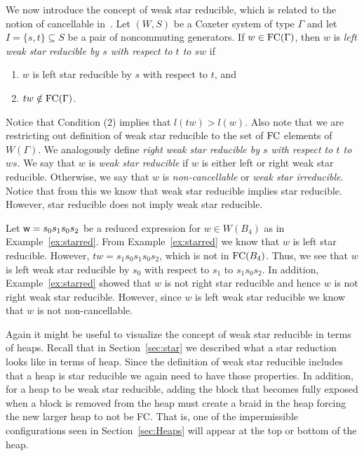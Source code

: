 We now introduce the concept of weak star reducible, which is related to the notion of cancellable in~\cite{Fan1997}. Let $(W,S)$ be a Coxeter system of type $\Gamma$ and let $I=\{s,t\} \subseteq S$ be a pair of noncommuting generators. If $w  \in \mathrm{FC}(\Gamma)$, then $w$ is \emph{left weak star reducible by $s$ with respect to $t$ to $sw$} if
\begin{enumerate}[leftmargin=2cm]
\item $w$ is left star reducible by $s$ with respect to $t$, and
\item $tw \notin \mathrm{FC}(\Gamma)$.	
\end{enumerate}
Notice that Condition (2) implies that $l(tw)>l(w)$. Also note that we are restricting out definition of weak star reducible to the set of $\mathrm{FC}$ elements of $W(\Gamma)$. We analogously define \emph{right weak star reducible by $s$ with respect to $t$ to $ws$}. We say that $w$ is \emph{weak star reducible} if $w$ is either left or right weak star reducible. Otherwise, we say that $w$ is \emph{non-cancellable} or \emph{weak star irreducible}. Notice that from this we know that weak star reducible implies star reducible. However, star reducible does not imply weak star reducible.

\begin{example}\label{ex:noncancel}
 Let $\mathsf{w}=s_0s_1s_0s_2$ be a reduced expression for $w \in W(B_4)$ as in Example~\ref{ex:starred}. From Example~\ref{ex:starred} we know that $w$ is left star reducible. However, $tw=s_1s_0s_1s_0s_2$, which is not in $\mathrm{FC}(B_4)$. Thus, we see that $w$ is left weak star reducible by $s_0$ with respect to $s_1$ to $s_1s_0s_2$. In addition, Example~\ref{ex:starred} showed that $w$ is not right star reducible and hence $w$ is not right weak star reducible. However, since $w$ is left weak star reducible we know that $w$ is not non-cancellable.
\end{example}

Again it might be useful to visualize the concept of weak star reducible in terms of heaps. Recall that in Section~\ref{sec:star} we described what a star reduction looks like in terms of heap. Since the definition of weak star reducible includes that a heap is star reducible we again need to have those properties. In addition, for a heap to be weak star reducible, adding the block that becomes fully exposed when a block is removed from the heap must create a braid in the heap forcing the new larger heap to not be FC. That is, one of the impermissible configurations seen in Section~\ref{sec:Heaps} will appear at the top or bottom of the heap.

